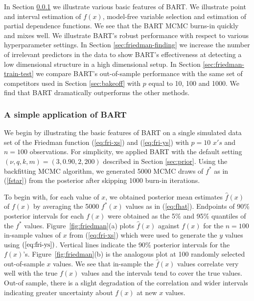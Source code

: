 \documentclass[aoas,nameyear,dvips]{arximspdf}
\begin{document}
In Section \ref{sec:friedman-simple} we illustrate various basic
features of BART.  We illustrate point and interval estimation of
$f(x)$,  model-free variable selection and estimation of partial
dependence functions.  We see that the BART MCMC burns-in quickly and
mixes well. We illustrate BART's robust performance with respect to
various hyperparameter settings.  In Section \ref{sec:friedman-finding}
we increase the number of irrelevant predictors in the data to show
BART's effectiveness at detecting a low dimensional structure in a high
dimensional setup. In Section \ref{sec:friedman-train-test} we compare
BART's out-of-sample performance with the same set of competitors used
in Section \ref{sec:bakeoff} with $p$ equal to 10, 100 and 1000. We
find that BART dramatically outperforms the other methods.


\subsubsection{A simple application of BART}\label{sec:friedman-simple}

We begin by illustrating the basic features of BART on a single simulated data set
of the Friedman function (\ref{eq:fri-xs}) and (\ref{eq:fri-ys})
with $p= 10$ $x's$ and $n = 100$ observations. For simplicity, we
applied BART with the default setting $(\nu, q, k,m) = (3,0.90,2,200)$
described in Section \ref{sec:prior}.
Using the backfitting MCMC algorithm, we generated 5000 MCMC draws
of $f^*$ as in (\ref{fstar}) from the posterior  after skipping
1000 burn-in iterations.

To begin with, for each value of $x$, we obtained
posterior mean estimates $\hat{f}(x)$ of $f(x)$  by averaging the
5000 $f^*(x)$ values as in (\ref{eq:fhat}). Endpoints of 90\% posterior intervals for
each $f(x)$ were obtained as the 5\% and 95\% quantiles of the
$f^*$ values.  Figure~\ref{fig:friedman}(a)
plots $\hat{f}(x)$ against
$f(x)$ for the $n= 100$ in-sample values of $x$ from
(\ref{eq:fri-xs}) which were used to generate the $y$ values using
$(\ref{eq:fri-ys})$. Vertical lines indicate the 90\% posterior
intervals for the $f(x)$'s. Figure~\ref{fig:friedman}(b) is the
analogous plot at 100 randomly selected out-of-sample $x$ values.
We see that in-sample the $\hat{f}(x)$ values correlate very well with the
true $f(x)$ values and the intervals tend to cover the true
values.  Out-of sample, there is a slight degradation of the correlation and
wider intervals indicating
greater uncertainty about $f(x)$ at new $x$ values.
\end{document}
